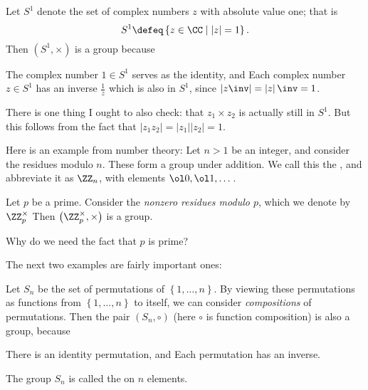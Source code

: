 \begin{example}
	Let $S^1$ denote the set of complex numbers $z$ with absolute value one; that is
	\[ S^1 \defeq \left\{ z \in \CC \mid \left\lvert z \right\rvert = 1 \right\}. \]
	Then $(S^1, \times)$ is a group because
	\begin{itemize}
		\ii The complex number $1 \in S^1$ serves as the identity, and
		\ii Each complex number $z \in S^1$ has an inverse $\frac 1z$ which is also in $S^1$, since $\left\lvert z\inv \right\rvert = \left\lvert z \right\rvert\inv = 1$.
	\end{itemize}
	There is one thing I ought to also check: that $z_1 \times z_2$ is actually still in $S^1$.
	But this follows from the fact that $\left\lvert z_1z_2 \right\rvert = \left\lvert z_1 \right\rvert \left\lvert z_2 \right\rvert = 1$.
\end{example}

\begin{example}
	Here is an example from number theory:
	Let $n > 1$ be an integer,
	and consider the residues modulo $n$.
	These form a group under addition.
	We call this the \vocab{cyclic group of order $n$},
	and abbreviate it as $\Zc n$, with elements $\ol 0, \ol 1, \dots$.
	\label{def:cyclic_group}
\end{example}
\begin{example}
	Let $p$ be a prime.
	Consider the \emph{nonzero residues modulo $p$},
	which we denote by $\Zm p$
	Then $\left( \Zm p, \times \right)$ is a group.
	\label{def:mult_mod_p}
\end{example}
\begin{ques}
	Why do we need the fact that $p$ is prime?
\end{ques}

The next two examples are fairly important ones:

\begin{example}
	Let $S_n$ be the set of permutations of $\left\{ 1,\dots,n \right\}$.
	By viewing these permutations as functions from $\left\{ 1,\dots,n \right\}$ to itself, we can consider \emph{compositions} of permutations.
	Then the pair $(S_n, \circ)$ (here $\circ$ is function composition)
	is also a group, because
	\begin{itemize}
		\ii There is an identity permutation, and
		\ii Each permutation has an inverse.
	\end{itemize}
	The group $S_n$ is called the  on $n$ elements.
\end{example}

